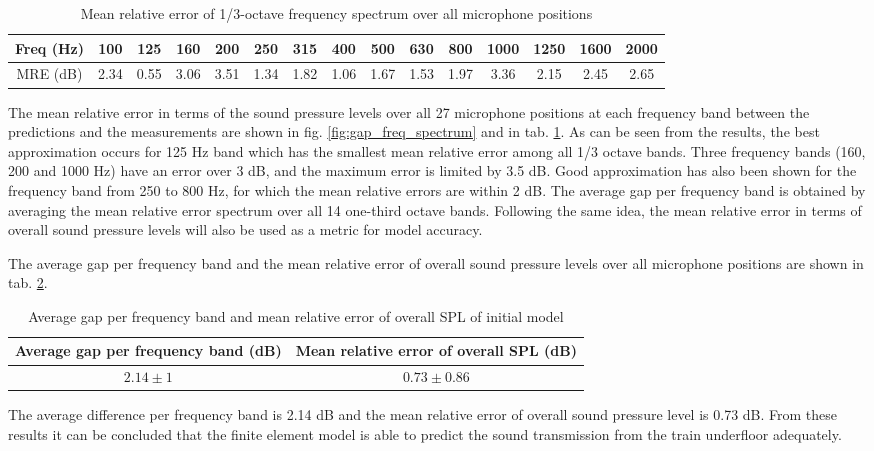 \begin{table}[H]
	\caption{Mean relative error of 1/3-octave frequency spectrum over all microphone positions}
	\begin{tabular}{c|cccccccccccccc}
		Freq (Hz)           & 100  & 125  & 160  & 200  & 250  & 315  & 400  & 500  & 630  & 800  & 1000 & 1250 & 1600 & 2000 \\ \hline
		MRE (dB) & 2.34 & 0.55 & 3.06 & 3.51 & 1.34 & 1.82 & 1.06 & 1.67 & 1.53 & 1.97 & 3.36 & 2.15 & 2.45 & 2.65
	\end{tabular}
	\label{tab:MRE_spectra}
\end{table}

The mean relative error in terms of the sound pressure levels over all 27 microphone positions at each frequency band between the predictions and the measurements are shown in fig. \ref{fig:gap_freq_spectrum} and in tab. \ref{tab:MRE_spectra}. As can be seen from the results, the best approximation occurs for 125 Hz band which has the smallest mean relative error among all 1/3 octave bands. Three frequency bands (160, 200 and 1000 Hz) have an error over 3 dB, and the maximum error is limited by 3.5 dB. Good approximation has also been shown for the frequency band from 250 to 800 Hz, for which the mean relative errors are within 2 dB. The average gap per frequency band is obtained by averaging the mean relative error spectrum over all 14 one-third octave bands. Following the same idea, the mean relative error in terms of overall sound pressure levels will also be used as a metric for model accuracy.

The average gap per frequency band and the mean relative error of overall sound pressure levels over all microphone positions are shown in tab. \ref{tab:average_gap}.


\begin{table}[H]
	\centering
	\caption{Average gap per frequency band and mean relative error of overall SPL of initial model}
	\begin{tabular}{c|c}
		Average gap per  frequency band (dB) & Mean relative error of overall SPL (dB) \\ \hline
		$2.14\pm1$                               & $0.73\pm0.86$                             
	\end{tabular}
	\label{tab:average_gap}
\end{table}

The average difference per frequency band is 2.14 dB and the mean relative error of overall sound pressure level is 0.73 dB. From these results it can be concluded that the finite element model is able to predict the sound transmission from the train underfloor adequately.


